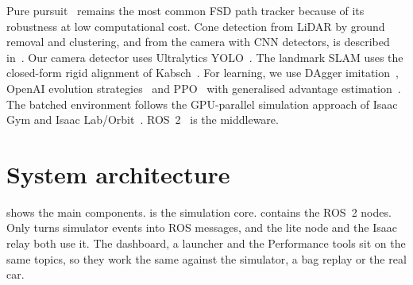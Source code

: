 \documentclass[11pt]{article}
\begin{document}
Pure pursuit~\cite{coulter1992} remains the most common FSD path tracker because of its robustness at low
computational cost. Cone detection from LiDAR by ground removal and clustering, and from the camera with CNN
detectors, is described in~\cite{dhall2019,kabzan2020}. Our camera detector uses Ultralytics YOLO~\cite{yolo11}.
The landmark SLAM uses the closed-form rigid alignment of Kabsch~\cite{kabsch1976}. For learning, we use DAgger
imitation~\cite{ross2011}, OpenAI evolution strategies~\cite{salimans2017} and PPO~\cite{schulman2017} with
generalised advantage estimation~\cite{schulman2016}. The batched environment follows the GPU-parallel simulation
approach of Isaac Gym and Isaac Lab/Orbit~\cite{makoviychuk2021,mittal2023}. ROS~2~\cite{macenski2022} is the
middleware.

\section{System architecture}\label{sec:arch}
 shows the main components.  is the simulation core.  contains
the ROS~2 nodes. Only  turns simulator events into ROS messages, and the lite node and the
Isaac relay both use it. The dashboard, a launcher and the Performance tools sit on the same topics, so they work
the same against the simulator, a bag replay or the real car.
\end{document}
